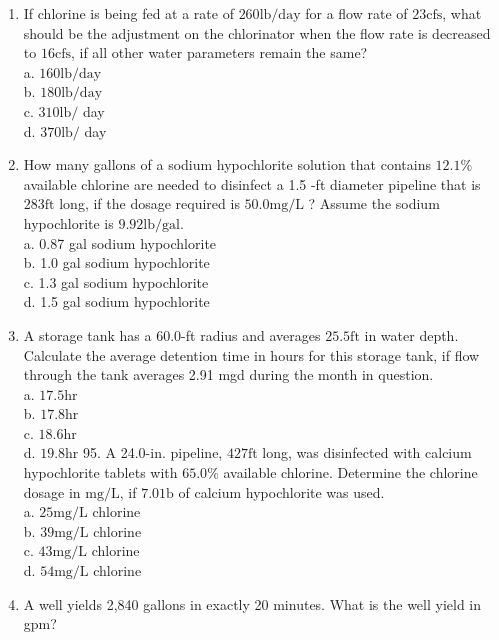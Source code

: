 \begin{enumerate}
\item If chlorine is being fed at a rate of $260 \mathrm{lb} / \mathrm{day}$ for a flow rate of $23 \mathrm{cfs}$, what should be the adjustment on the chlorinator when the flow rate is decreased to $16 \mathrm{cfs}$, if all other water parameters remain the same?\\
a. $160 \mathrm{lb} / \mathrm{day}$\\
b. $180 \mathrm{lb} / \mathrm{day}$\\
c. $310 \mathrm{lb} /$ day\\
d. $370 \mathrm{lb} /$ day\\
\item How many gallons of a sodium hypochlorite solution that contains $12.1 \%$ available chlorine are needed to disinfect a 1.5 -ft diameter pipeline that is $283 \mathrm{ft}$ long, if the dosage required is $50.0 \mathrm{mg} / \mathrm{L}$ ? Assume the sodium hypochlorite is $9.92 \mathrm{lb} / \mathrm{gal}$.\\
a. 0.87 gal sodium hypochlorite\\
b. 1.0 gal sodium hypochlorite\\
c. 1.3 gal sodium hypochlorite\\
d. 1.5 gal sodium hypochlorite\\
\item A storage tank has a 60.0-ft radius and averages $25.5 \mathrm{ft}$ in water depth. Calculate the average detention time in hours for this storage tank, if flow through the tank averages 2.91 mgd during the month in question.\\
a. $17.5 \mathrm{hr}$\\
b. $17.8 \mathrm{hr}$\\
c. $18.6 \mathrm{hr}$\\
d. $19.8 \mathrm{hr}$ 95. A 24.0-in. pipeline, $427 \mathrm{ft}$ long, was disinfected with calcium hypochlorite tablets with $65.0 \%$ available chlorine. Determine the chlorine dosage in $\mathrm{mg} / \mathrm{L}$, if $7.0 \mathrm{1b}$ of calcium hypochlorite was used.\\
a. $25 \mathrm{mg} / \mathrm{L}$ chlorine\\
b. $39 \mathrm{mg} / \mathrm{L}$ chlorine\\
c. $43 \mathrm{mg} / \mathrm{L}$ chlorine\\
d. $54 \mathrm{mg} / \mathrm{L}$ chlorine\\
\item A well yields 2,840 gallons in exactly 20 minutes. What is the well yield in gpm?\\

\end{enumerate}
